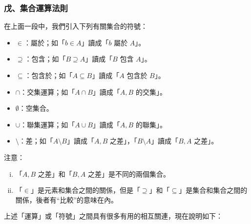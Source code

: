 \subsubsection*{戊、集合運算法則}\label{subsec:2-3-e}

在上面一段中，我們引入下列有關集合的符號：
\begin{itemize}
  \item $\in$：屬於；如「$b \in A$」讀成「$b$ 屬於 $A$」。
  \item $\supseteq$：包含；如「$B \supseteq A$」讀成「$B$ 包含 $A$」。
  \item $\subseteq$：包含於；如「$A \subseteq B$」讀成「$A$ 包含於 $B$」。
  \item $\cap$：交集運算；如「$A \cap B$」讀成「$A, B$ 的交集」。
  \item $\emptyset$：空集合。
  \item $\cup$：聯集運算；如「$A \cup B$」讀成「$A, B$ 的聯集」。
  \item $\setminus$：差；如「$A \setminus B$」讀成「$A, B$ 之差」，「$B \setminus A$」讀成「$B, A$ 之差」。
\end{itemize}

注意：
\begin{enumerate}[(i)]
  \item 「$A, B$ 之差」和「$B, A$ 之差」是不同的兩個集合。
  \item 「$\in$」是元素和集合之間的關係，但是「$\supseteq$」和「$\subseteq$」是集合和集合之間的關係，後者有“比較”的意味在內。
\end{enumerate}

上述「運算」或「符號」之間具有很多有用的相互關連，現在說明如下：

